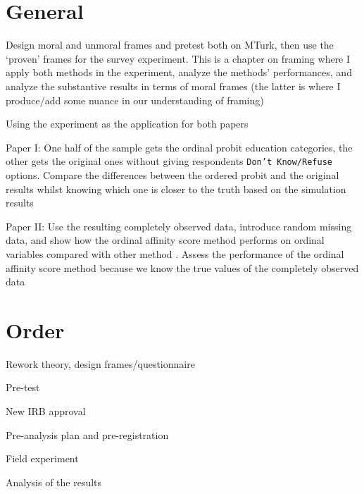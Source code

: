 \section*{General}
	\begin{coi}
		\item Design moral and unmoral frames and pretest both on MTurk, then use the `proven' frames for the survey experiment. This is a chapter on framing where I apply both methods in the experiment, analyze the methods' performances, and analyze the substantive results in terms of moral frames (the latter is where I produce/add some nuance in our understanding of framing)
		\item Using the experiment as the application for both papers
			\begin{coi}
				\item Paper I: One half of the sample gets the ordinal probit education categories, the other gets the original ones without giving respondents \texttt{Don't Know/Refuse} options. Compare the differences between the ordered probit and the original results whilst knowing which one is closer to the truth based on the simulation results
				\item Paper II: Use the resulting completely observed data, introduce random missing data, and show how the ordinal affinity score method performs on ordinal variables compared with other method	. Assess the performance of the ordinal affinity score method because we know the true values of the completely observed data
			\end{coi}
	\end{coi}	
		

\section*{Order}
	\begin{coi}
		\item Rework theory, design frames/questionnaire
		\item Pre-test
		\item New IRB approval
		\item Pre-analysis plan and pre-registration
		\item Field experiment
		\item Analysis of the results
	\end{coi}


